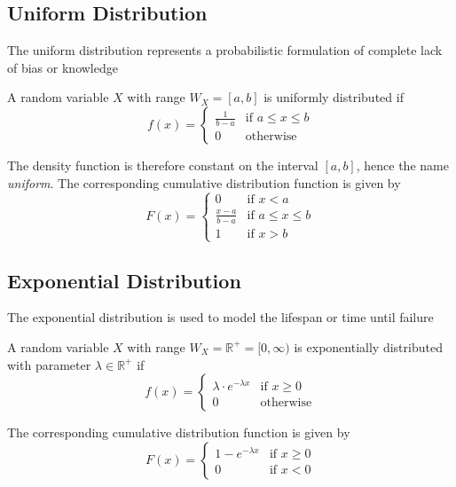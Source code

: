 \documentclass[11pt]{article}
\theoremstyle{definition}
\newcommand*\R{\mathbb{R}}
\begin{document}
\subsection{Uniform Distribution}
The uniform distribution represents a probabilistic formulation of complete lack of bias or knowledge
\begin{definition}
	A random variable $X$ with range $W_X = [a,b]$ is uniformly distributed if
	\begin{equation*}
		f(x) = \left\{
			\begin{matrix}
				\frac{1}{b-a} & \text{if } a\leq x \leq b\\
				0 & \text{otherwise}
			\end{matrix}
		\right.
	\end{equation*}
\end{definition}
The density function is therefore constant on the interval $[a,b]$, hence the name \emph{uniform}. The corresponding cumulative distribution function is given by
\begin{equation*}
	F(x) = \left\{
		\begin{matrix}
			0 & \text{if } x < a\\
			\frac{x-a}{b-a} & \text{if } a\leq x \leq b\\
			1 & \text{if } x > b
		\end{matrix}
		\right.
\end{equation*}

\subsection{Exponential Distribution}
The exponential distribution is used to model the lifespan or time until failure
\begin{definition}
	A random variable $X$ with range $W_X = \R^+ = [0,\infty)$ is exponentially distributed with parameter $\lambda \in \R^+$ if
	\begin{equation*}
		f(x) = \left\{
			\begin{matrix}
			\lambda\cdot e^{-\lambda x} & \text{if } x\geq 0\\
			0 & \text{otherwise}
			\end{matrix}
		\right.
	\end{equation*}
\end{definition}
The corresponding cumulative distribution function is given by
\begin{equation*}
		F(x) = \left\{
		\begin{matrix}
			1 - e^{-\lambda x} & \text{if } x\geq 0\\
			0 & \text{if } x < 0
		\end{matrix}
	\right.
\end{equation*}
\end{document}
